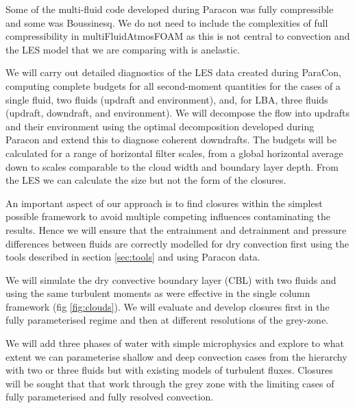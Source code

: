 \documentclass[11pt,a4paper]{article}
\begin{document}
Some of the multi-fluid code developed during Paracon was fully compressible and some was Boussinesq. We do not need to include the complexities of full compressibility in multiFluidAtmosFOAM as this is not central to convection and the LES model that we are comparing with is anelastic. 


We will carry out detailed diagnostics of the LES data created during ParaCon, computing complete budgets for all second-moment quantities for the cases of a single fluid, two fluids (updraft and environment), and, for LBA, three fluids (updraft, downdraft, and environment).
We will decompose the flow into updrafts and their environment using the optimal decomposition developed during Paracon and extend this to diagnose coherent downdrafts. The budgets will be calculated for a range of horizontal filter scales, from a global horizontal average down to scales comparable to the cloud width and boundary layer depth. From the LES we can calculate the size but not the form of the closures.


An important aspect of our approach is to find closures within the simplest possible framework to avoid multiple competing influences contaminating the results. Hence we will ensure that the entrainment and detrainment and pressure differences between fluids are correctly modelled for dry convection first using the tools described in section \ref{sec:tools} and using Paracon data.

We will simulate the dry convective boundary layer (CBL) with two fluids and using the same turbulent moments as were effective in the single column framework (fig \ref{fig:clouds}). We will evaluate and develop closures first in the fully parameterised regime and then at different resolutions of the grey-zone.


We will add three phases of water with simple microphysics and explore to what extent we can parameterise shallow and deep convection cases from the hierarchy with two or three fluids but with existing models of turbulent fluxes. Closures will be sought that that work through the grey zone with the limiting cases of fully parameterised and fully resolved convection.
\end{document}
